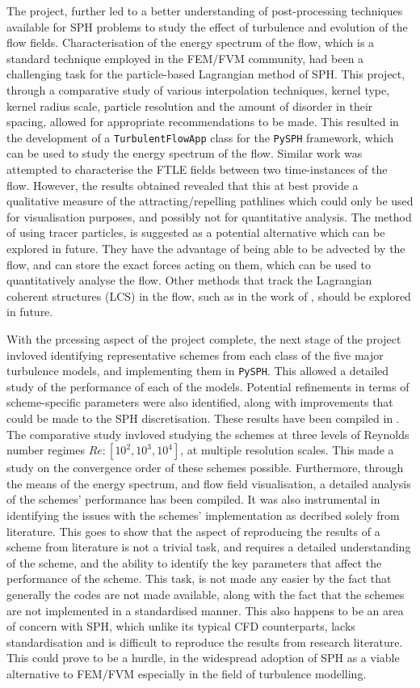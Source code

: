 The project, further led to a better understanding of post-processing techniques available for SPH problems to study the effect of turbulence and evolution of the flow fields.
Characterisation of the energy spectrum of the flow, which is a standard technique employed in the FEM/FVM community, had been a challenging task for the particle-based Lagrangian method of SPH. 
This project, through a comparative study of various interpolation techniques, kernel type, kernel radius scale, particle resolution and the amount of disorder in their spacing, allowed for appropriate recommendations to be made. This resulted in the development of a \texttt{TurbulentFlowApp} class for the \texttt{PySPH} framework, which can be used to study the energy spectrum of the flow.
Similar work was attempted to characterise the FTLE fields between two time-instances of the flow. However, the results obtained revealed that this at best provide a qualitative measure of the attracting/repelling pathlines which could only be used for visualisation purposes, and possibly not for quantitative analysis. The method of using tracer particles, is suggested as a potential alternative which can be explored in future. They have the advantage of being able to be advected by the flow, and can store the exact forces acting on them, which can be used to quantitatively analyse the flow. Other methods that track the Lagrangian coherent structures (LCS) in the flow, such as in the work of \cite{shadden2005definition}, should be explored in future.

With the prcessing aspect of the project complete, the next stage of the project invloved identifying representative schemes from each class of the five major turbulence models, and implementing them in \texttt{PySPH}.
This allowed a detailed study of the performance of each of the models. Potential refinements in terms of scheme-specific parameters were also identified, along with improvements that could be made to the SPH discretisation. These results have been compiled in .
The comparative study invloved studying the schemes at three levels of Reynolds number regimes $Re: [10^2, 10^3, 10^4]$, at multiple resolution scales. This made a study on the convergence order of these schemes possible. Furthermore, through the means of the energy spectrum, and flow field visualisation, a detailed analysis of the schemes' performance has been compiled. It was also instrumental in identifying the issues with the schemes' implementation as decribed solely from literature.
This goes to show that the aspect of reproducing the results of a scheme from literature is not a trivial task, and requires a detailed understanding of the scheme, and the ability to identify the key parameters that affect the performance of the scheme. This task, is not made any easier by the fact that generally the codes are not made available, along with the fact that the schemes are not implemented in a standardised manner.
This also happens to be an area of concern with SPH, which unlike its typical CFD counterparts, lacks standardisation and is difficult to reproduce the results from research literature. This could prove to be a hurdle, in the widespread adoption of SPH as a viable alternative to FEM/FVM especially in the field of turbulence modelling.

